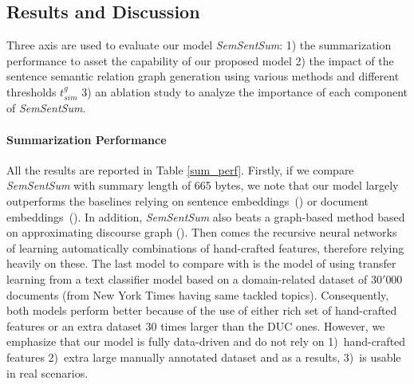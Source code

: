 \documentclass{article}
\begin{document}
\subsection{Results and Discussion}

Three axis are used to evaluate our model \textit{SemSentSum}: 1) the summarization performance to asset the capability of our proposed model 2) the impact of the sentence semantic relation graph generation using various methods and different thresholds $t_{sim}^g$ 3) an ablation study to analyze the importance of each component of \textit{SemSentSum}.

\paragraph{Summarization Performance}
All the results are reported in Table \ref{sum_perf}. Firstly, if we compare \textit{SemSentSum} with summary length of 665 bytes, we note that our model largely outperforms the baselines relying on sentence embeddings~(\citet{bennani2018embedrank}) or document embeddings~(\citet{mani2017multi}). In addition, \textit{SemSentSum} also beats 
a graph-based method based on approximating discourse graph (\citet{christensen2013towards}). Then comes the recursive neural networks of \citet{cao2015ranking} learning automatically combinations of hand-crafted features, therefore relying heavily on these. The last model to compare with is the model of \citet{CaoLLW17} using transfer learning from a text classifier model based on a domain-related dataset of $30'000$ documents (from New York Times having same tackled topics). Consequently, both models perform better because of the use of either rich set of hand-crafted features or an extra dataset $30$ times larger than the DUC ones. However, we emphasize that our model is fully data-driven and do not rely on 1)~hand-crafted features 2)~extra large manually annotated dataset and as a results, 3)~is usable in real scenarios. %
\end{document}
